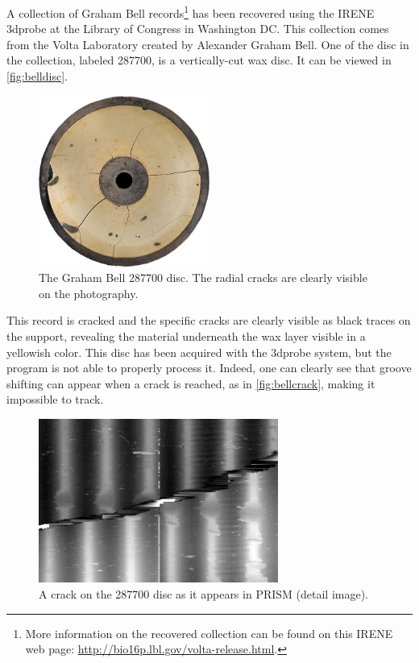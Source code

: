 A collection of Graham Bell records\footnote{More information on the recovered collection can be found on this IRENE web page: \url{http://bio16p.lbl.gov/volta-release.html}.} has been recovered using the IRENE \gls{3dprobe} at the Library of Congress in Washington DC. This collection comes from the Volta Laboratory created by Alexander Graham Bell. One of the disc in the collection, labeled 287700, is a vertically-cut wax disc. It can be viewed in \autoref{fig:belldisc}.

\begin{figure}[!ht]
\centering
\includegraphics[width=0.5\textwidth]{images/bell-disc}
\caption[The Graham Bell 287700 disc.]{The Graham Bell 287700 disc. The radial cracks are clearly visible on the photography.}
\label{fig:belldisc}
\end{figure}

This record is cracked and the specific cracks are clearly visible as black traces on the support, revealing the material underneath the wax layer visible in a yellowish color. This disc has been acquired with the \gls{3dprobe} system, but the program is not able to properly process it. Indeed, one can clearly see that groove shifting can appear when a crack is reached, as in \autoref{fig:bellcrack}, making it impossible to track.

\begin{figure}[!ht]
\centering
\includegraphics[width=0.7\textwidth]{images/bell-crack}
\caption{A crack on the 287700 disc as it appears in PRISM (detail image).}
\label{fig:bellcrack}
\end{figure}

